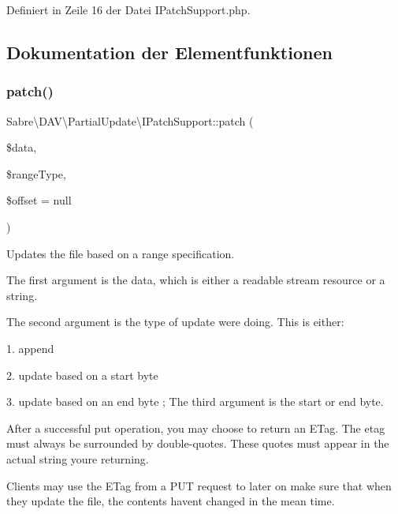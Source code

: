 Definiert in Zeile 16 der Datei I\+Patch\+Support.\+php.



\subsection{Dokumentation der Elementfunktionen}
\mbox{\label{interface_sabre_1_1_d_a_v_1_1_partial_update_1_1_i_patch_support_a30ad366876434b6d36f93c4143a8a323}} 
\subsubsection{\texorpdfstring{patch()}{patch()}}
{\footnotesize\ttfamily Sabre\textbackslash{}\+D\+A\+V\textbackslash{}\+Partial\+Update\textbackslash{}\+I\+Patch\+Support\+::patch (\begin{DoxyParamCaption}\item[{}]{\$data,  }\item[{}]{\$range\+Type,  }\item[{}]{\$offset = {\ttfamily null} }\end{DoxyParamCaption})}

Updates the file based on a range specification.

The first argument is the data, which is either a readable stream resource or a string.

The second argument is the type of update we\textquotesingle{}re doing. This is either\+:
\begin{DoxyItemize}
\item 1. append
\item 2. update based on a start byte
\item 3. update based on an end byte ; The third argument is the start or end byte.
\end{DoxyItemize}

After a successful put operation, you may choose to return an E\+Tag. The etag must always be surrounded by double-\/quotes. These quotes must appear in the actual string you\textquotesingle{}re returning.

Clients may use the E\+Tag from a P\+UT request to later on make sure that when they update the file, the contents haven\textquotesingle{}t changed in the mean time.


